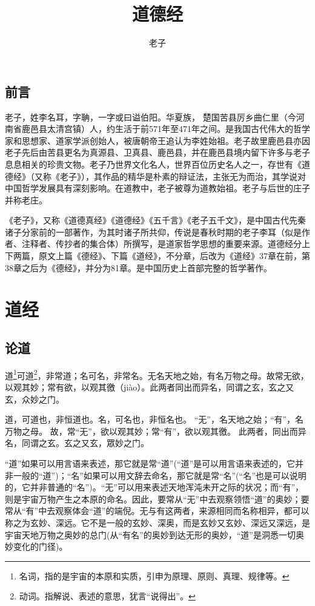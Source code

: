 \documentclass[a4paper,12pt,UTF8,twoside]{ctexbook}
\title{\heiti\zihao{0} 道德经}
\author{老子}
\date{}
\begin{document}
	\maketitle

	\tableofcontents
	
	\frontmatter
	\chapter{前言}
	
	老子，姓李名耳，字聃，一字或曰谥伯阳。华夏族， 楚国苦县厉乡曲仁里（今河南省鹿邑县太清宫镇）人，约生活于前571年至471年之间。是我国古代伟大的哲学家和思想家、道家学派创始人，被唐朝帝王追认为李姓始祖。老子故里鹿邑县亦因老子先后由苦县更名为真源县、卫真县、鹿邑县，并在鹿邑县境内留下许多与老子息息相关的珍贵文物。老子乃世界文化名人，世界百位历史名人之一，存世有《道德经》（又称《老子》），其作品的精华是朴素的辩证法，主张无为而治，其学说对中国哲学发展具有深刻影响。在道教中，老子被尊为道教始祖。老子与后世的庄子并称老庄。
	
	《老子》，又称《道德真经》《道德经》《五千言》《老子五千文》，是中国古代先秦诸子分家前的一部著作，为其时诸子所共仰，传说是春秋时期的老子李耳（似是作者、注释者、传抄者的集合体）所撰写，是道家哲学思想的重要来源。道德经分上下两篇，原文上篇《德经》、下篇《道经》，不分章，后改为《道经》37章在前，第38章之后为《德经》，并分为81章。是中国历史上首部完整的哲学著作。 
	
	\mainmatter
	
	\part{道经}
	
	\chapter{论道}
	
	道\footnote{名词，指的是宇宙的本原和实质，引申为原理、原则、真理、规律等。}可道\footnote{动词。指解说、表述的意思，犹言“说得出”。}，非常道；名可名，非常名。无名天地之始，有名万物之母。故常无欲，以观其妙；常有欲，以观其徼（jiào）。此两者同出而异名，同谓之玄，玄之又玄，众妙之门。
	
	道，可道也，非恒道也。名，可名也，非恒名也。 “无”，名天地之始；“有”，名万物之母。 故，常“无”，欲以观其妙；常“有”，欲以观其徼。 此两者，同出而异名，同谓之玄。玄之又玄，眾妙之门。
	
	“道”如果可以用言语来表述，那它就是常“道”(“道”是可以用言语来表述的，它并非一般的“道”)；“名”如果可以用文辞去命名，那它就是常“名”(“名”也是可以说明的，它并非普通的“名”)。“无”可以用来表述天地浑沌未开之际的状况；而“有”，则是宇宙万物产生之本原的命名。因此，要常从“无”中去观察领悟“道”的奥妙；要常从“有”中去观察体会“道”的端倪。无与有这两者，来源相同而名称相异，都可以称之为玄妙、深远。它不是一般的玄妙、深奥，而是玄妙又玄妙、深远又深远，是宇宙天地万物之奥妙的总门(从“有名”的奥妙到达无形的奥妙，“道”是洞悉一切奥妙变化的门径)。
	
\end{document}
